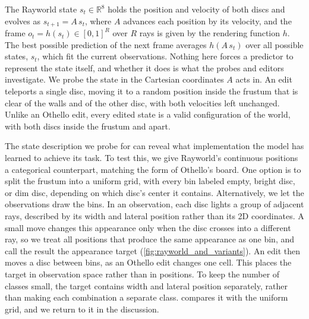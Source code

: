 \documentclass{article} %
\begin{document}
The Rayworld state $s_t \in \mathbb{R}^8$ holds the position and velocity of both discs and evolves as $s_{t+1} = A\,s_t$, where $A$ advances each position by its velocity, and the frame $o_t = h(s_t) \in [0,1]^R$ over $R$ rays is given by the rendering function $h$. The best possible prediction of the next frame averages $h(A\,s_t)$ over all possible states, $s_t$, which fit the current observations. Nothing here forces a predictor to represent the state itself, and whether it does is what the probes and editors investigate. We probe the state in the Cartesian coordinates $A$ acts in. An edit teleports a single disc, moving it to a random position inside the frustum that is clear of the walls and of the other disc, with both velocities left unchanged. Unlike an Othello edit, every edited state is a valid configuration of the world, with both discs inside the frustum and apart.

The state description we probe for can reveal what implementation the model has learned to achieve its task. To test this, we give Rayworld's continuous positions a categorical counterpart, matching the form of Othello's board. One option is to split the frustum into a uniform grid, with every bin labeled empty, bright disc, or dim disc, depending on which disc's center it contains. Alternatively, we let the observations draw the bins. In an observation, each disc lights a group of adjacent rays, described by its width and lateral position rather than its 2D coordinates. A small move changes this appearance only when the disc crosses into a different ray, so we treat all positions that produce the same appearance as one bin, and call the result the appearance target (\cref{fig:rayworld_and_variants}). An edit then moves a disc between bins, as an Othello edit changes one cell. This places the target in observation space rather than in positions. To keep the number of classes small, the target contains width and lateral position separately, rather than making each combination a separate class.  compares it with the uniform grid, and we return to it in the discussion.

\end{document}
